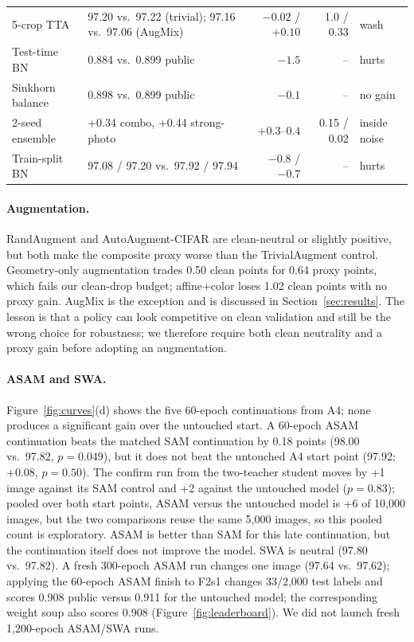 \begin{table}[t]
\begin{tabular}{@{}p{}p{}rrp{}@{}}
5-crop TTA & 97.20 vs.\ 97.22 (trivial); 97.16 vs.\ 97.06 (AugMix) & $-0.02$ / $+0.10$ & 1.0 / 0.33 & wash \\
Test-time BN & 0.884 vs.\ 0.899 public & $-1.5$ & -- & hurts \\
Sinkhorn balance & 0.898 vs.\ 0.899 public & $-0.1$ & -- & no gain \\
2-seed ensemble & +0.34 combo, +0.44 strong-photo & $+0.3$--$0.4$ & 0.15 / 0.02 & inside noise \\
Train-split BN & 97.08 / 97.20 vs.\ 97.92 / 97.94 & $-0.8$ / $-0.7$ & -- & hurts \\
\bottomrule
\end{tabular}
\end{table}

\paragraph{Augmentation.}
RandAugment and AutoAugment-CIFAR are clean-neutral or slightly positive, but both
make the composite proxy worse than the TrivialAugment control. Geometry-only
augmentation trades 0.50 clean points for 0.64 proxy points, which fails our
clean-drop budget; affine+color loses 1.02 clean points with no proxy gain.
AugMix is the exception and is discussed in Section~\ref{sec:results}. The lesson
is that a policy can look competitive on clean validation and still be the wrong
choice for robustness; we therefore require both clean neutrality and a proxy
gain before adopting an augmentation.

\paragraph{ASAM and SWA.}
Figure~\ref{fig:curves}(d) shows the five 60-epoch continuations from A4; none
produces a significant gain over the untouched start. A 60-epoch ASAM continuation beats the matched SAM
continuation by 0.18 points (98.00 vs.\ 97.82, $p=0.049$), but it does not beat
the untouched A4 start point (97.92; $+0.08$, $p=0.50$). The confirm run from the
two-teacher student moves by +1 image against its SAM control and +2 against the
untouched model ($p=0.83$); pooled over both start points, ASAM versus the
untouched model is +6 of 10,000 images, but the two comparisons reuse the same
5,000 images, so this pooled count is exploratory. ASAM is better than SAM for
this late continuation, but the continuation itself does not improve the model.
SWA is neutral (97.80 vs.\ 97.82). A fresh 300-epoch ASAM run changes one image
(97.64 vs.\ 97.62); applying the 60-epoch ASAM finish to F2s1 changes 33/2,000
test labels and scores 0.908 public versus 0.911 for the untouched model; the
corresponding weight soup also scores 0.908 (Figure~\ref{fig:leaderboard}). We did not launch fresh 1,200-epoch
ASAM/SWA runs.

